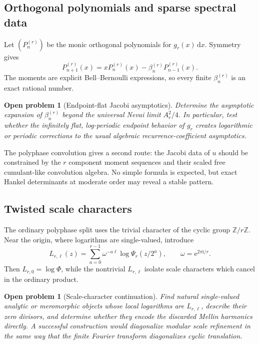 \documentclass[11pt,oneside]{article}
\numberwithin{equation}{section}
\newtheorem{problem}[theorem]{Open problem}
\theoremstyle{definition}
\theoremstyle{remark}
\newcommand{\Z}{\mathbb Z}
\newcommand{\dd}{\,\mathrm d}
\newcommand{\e}{\mathrm e}
\newcommand{\ii}{\mathrm i}
\begin{document}
\subsection{Orthogonal polynomials and sparse spectral data}

Let $(P_n^{(r)})$ be the monic orthogonal polynomials for $g_r(x)\dd x$.
Symmetry gives
\begin{equation}
 P_{n+1}^{(r)}(x)=xP_n^{(r)}(x)-\beta_n^{(r)}P_{n-1}^{(r)}(x). \label{eq:sparse-Jacobi}
\end{equation}
The moments are explicit Bell--Bernoulli expressions, so every finite
$\beta_n^{(r)}$ is an exact rational number.

\begin{problem}[Endpoint-flat Jacobi asymptotics]
Determine the asymptotic expansion of $\beta_n^{(r)}$ beyond the universal
Nevai limit $A_r^2/4$.  In particular, test whether the infinitely flat,
log-periodic endpoint behavior of $g_r$ creates logarithmic or periodic
corrections to the usual algebraic recurrence-coefficient asymptotics.
\end{problem}

The polyphase convolution gives a second route: the Jacobi data of $u$ should
be constrained by the $r$ component moment sequences and their scaled free
cumulant-like convolution algebra.  No simple formula is expected, but exact
Hankel determinants at moderate order may reveal a stable pattern.

\subsection{Twisted scale characters}

The ordinary polyphase split uses the trivial character of the cyclic group
$\Z/r\Z$.  Near the origin, where logarithms are single-valued, introduce
\begin{equation}
 L_{r,\ell}(z)=\sum_{a=0}^{r-1}\omega^{-a\ell}
 \log\Psi_r(z/2^a),
 \qquad \omega=\e^{2\pi\ii/r}.                            \label{eq:twisted-scale-log}
\end{equation}
Then $L_{r,0}=\log\Phi$, while the nontrivial $L_{r,\ell}$ isolate scale
characters which cancel in the ordinary product.

\begin{problem}[Scale-character continuation]
Find natural single-valued analytic or meromorphic objects whose local
logarithms are $L_{r,\ell}$, describe their zero divisors, and determine whether
they encode the discarded Mellin harmonics directly.  A successful construction
would diagonalize modular scale refinement in the same way that the finite
Fourier transform diagonalizes cyclic translation.
\end{problem}
\end{document}
